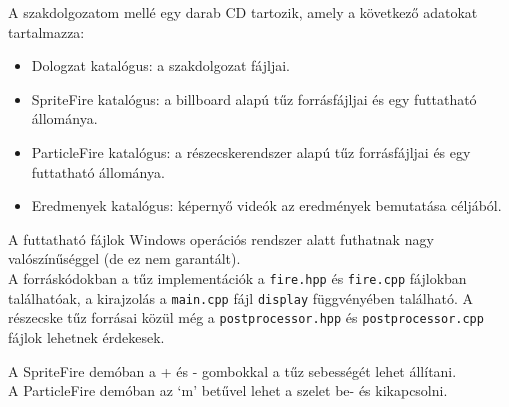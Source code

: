 
A szakdolgozatom mellé egy darab CD tartozik, amely a következő adatokat tartalmazza:
\begin{itemize}
\item Dologzat katalógus: a szakdolgozat fájljai.
\item SpriteFire katalógus: a billboard alapú tűz forrásfájljai és egy futtatható állománya.
\item ParticleFire katalógus: a részecskerendszer alapú tűz forrásfájljai és egy futtatható állománya.
\item Eredmenyek katalógus: képernyő videók az eredmények bemutatása céljából.
\end{itemize}

A futtatható fájlok Windows operációs rendszer alatt futhatnak nagy valószínűséggel (de ez nem garantált).\\
A forráskódokban a tűz implementációk a \texttt{fire.hpp} és \texttt{fire.cpp} fájlokban találhatóak, a kirajzolás a \texttt{main.cpp} fájl \texttt{display} függvényében található. A részecske tűz forrásai közül még a \texttt{postprocessor.hpp} és \texttt{postprocessor.cpp} fájlok lehetnek érdekesek. 

A SpriteFire demóban a + és - gombokkal a tűz sebességét lehet állítani.\\
A ParticleFire demóban az `m' betűvel lehet a szelet be- és kikapcsolni.




